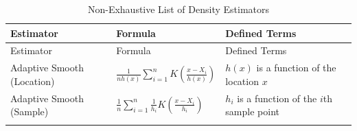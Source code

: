 \documentclass[12pt]{article}
\begin{document}
\begin{longtable}[]{@{}lll@{}}
\caption{Non-Exhaustive List of Density Estimators}\tabularnewline
\toprule
\begin{minipage}[b]{0.20\columnwidth}\raggedright\strut
Estimator\strut
\end{minipage} & \begin{minipage}[b]{0.32\columnwidth}\raggedright\strut
Formula\strut
\end{minipage} & \begin{minipage}[b]{0.38\columnwidth}\raggedright\strut
Defined Terms\strut
\end{minipage}\tabularnewline
\midrule
\endfirsthead
\toprule
\begin{minipage}[b]{0.20\columnwidth}\raggedright\strut
Estimator\strut
\end{minipage} & \begin{minipage}[b]{0.32\columnwidth}\raggedright\strut
Formula\strut
\end{minipage} & \begin{minipage}[b]{0.38\columnwidth}\raggedright\strut
Defined Terms\strut
\end{minipage}\tabularnewline
\midrule
\endhead
\begin{minipage}[t]{0.20\columnwidth}\raggedright\strut
Adaptive Smooth (Location)\strut
\end{minipage} & \begin{minipage}[t]{0.32\columnwidth}\raggedright\strut
\(\frac{1}{nh(x)} \sum^{n}_{i=1}{K \left( \frac{x-X_i}{h(x)}\right)}\)\strut
\end{minipage} & \begin{minipage}[t]{0.38\columnwidth}\raggedright\strut
\(h(x)\) is a function of the location \(x\)\strut
\end{minipage}\tabularnewline
\begin{minipage}[t]{0.20\columnwidth}\raggedright\strut
Adaptive Smooth (Sample)\strut
\end{minipage} & \begin{minipage}[t]{0.32\columnwidth}\raggedright\strut
\(\frac{1}{n} \sum^{n}_{i=1}{\frac{1}{h_i}K \left( \frac{x-X_i}{h_i}\right)}\)\strut
\end{minipage} & \begin{minipage}[t]{0.38\columnwidth}\raggedright\strut
\(h_i\) is a function of the \(i\)th sample point\strut
\end{minipage}\tabularnewline
\begin{minipage}[t]{0.20\columnwidth}\raggedright\strut

\end{minipage}
\end{longtable}
\end{document}
